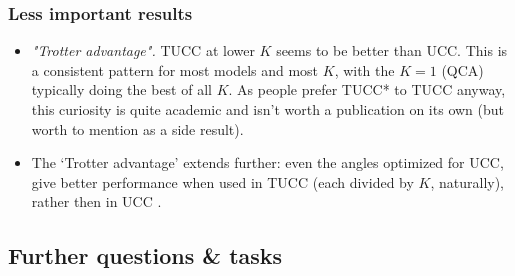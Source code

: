 \documentclass[10pt, a4paper]{article}
\begin{document}
\subsubsection*{Less important results}
\begin{itemize}
\item \textit{"Trotter advantage".} TUCC at lower $K$ seems to be better than UCC. This is a consistent pattern for most models and most $K$, with the $K=1$ (QCA) typically doing the best of all $K$. As people prefer TUCC* to TUCC anyway, this curiosity is quite academic and isn't worth a publication on its own (but worth to mention as a side result).

\item The `Trotter advantage' extends further: even the angles optimized for UCC, give better performance when used in TUCC (each divided by $K$, naturally), rather then in UCC .
\end{itemize}

\subsection*{Further questions \& tasks}
\end{document}
